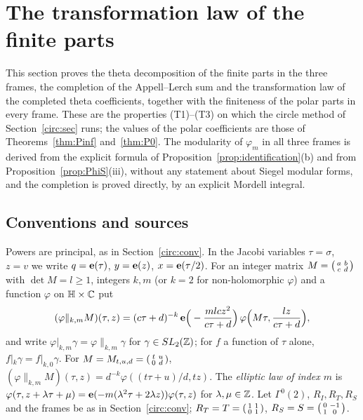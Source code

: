 \section{The transformation law of the finite parts}\label{tr:sec}

This section proves the theta decomposition of the finite parts in the three frames, the completion of the Appell--Lerch sum and the transformation law of the completed theta coefficients, together with the finiteness of the polar parts in every frame. These are the properties (T1)--(T3) on which the circle method of Section~\ref{circ:sec} runs; the values of the polar coefficients are those of Theorems~\ref{thm:Pinf} and~\ref{thm:P0}. The modularity of $\varphi_m$ in all three frames is derived from the explicit formula of Proposition~\ref{prop:identification}(b) and from Proposition~\ref{prop:PhiS}(iii), without any statement about Siegel modular forms, and the completion is proved directly, by an explicit Mordell integral.

\subsection{Conventions and sources}\label{tr:conv}
Powers are principal, as in Section~\ref{circ:conv}. In the Jacobi variables $\tau=\sigma$, $z=v$ we write $q=\mathbf e(\tau)$, $y=\mathbf e(z)$, $x=\mathbf e(\tau/2)$. For an integer matrix $M=\begin{psmallmatrix}a&b\\c&d\end{psmallmatrix}$ with $\det M=l\ge1$, integers $k,m$ (or $k=2$ for non-holomorphic $\varphi$) and a function $\varphi$ on $\mathbb{H}\times\mathbb{C}$ put
\[
(\varphi\|_{k,m}M)(\tau,z)=(c\tau+d)^{-k}\,\mathbf e\Big(-\frac{mlcz^2}{c\tau+d}\Big)\,\varphi\Big(M\tau,\frac{lz}{c\tau+d}\Big),
\]
and write $\varphi|_{k,m}\gamma=\varphi\|_{k,m}\gamma$ for $\gamma\in SL_2(\mathbb{Z})$; for $f$ a function of $\tau$ alone, $f|_k\gamma=f|_{k,0}\gamma$. For $M=M_{t,u,d}=\begin{psmallmatrix}t&u\\0&d\end{psmallmatrix}$, $(\varphi\|_{k,m}M)(\tau,z)=d^{-k}\varphi((t\tau+u)/d,tz)$. The \emph{elliptic law of index $m$} is $\varphi(\tau,z+\lambda\tau+\mu)=\mathbf e(-m(\lambda^2\tau+2\lambda z))\varphi(\tau,z)$ for $\lambda,\mu\in\mathbb{Z}$. Let $\Gamma^0(2)$, $R_I,R_T,R_S$ and the frames be as in Section~\ref{circ:conv}; $R_T=T=\begin{psmallmatrix}1&1\\0&1\end{psmallmatrix}$, $R_S=S=\begin{psmallmatrix}0&-1\\1&0\end{psmallmatrix}$.

